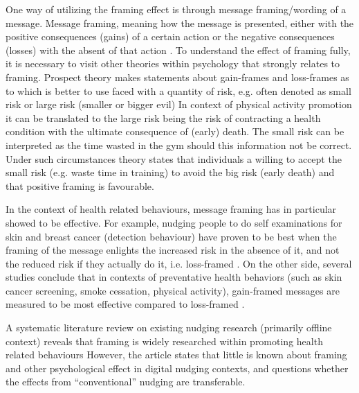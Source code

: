 One way of utilizing the framing effect is through message framing/wording of a message. Message framing, meaning how the message is presented, either with the positive consequences (gains) of a certain action or the negative consequences (losses) with the absent of that action \cite{rothman_shaping_1997}.
To understand the effect of framing fully, it is necessary to visit other theories within psychology that strongly relates to framing. Prospect theory makes statements about gain-frames and loss-frames as to which is better to use faced with a quantity of risk, e.g. often denoted as small risk or large risk (smaller or bigger evil)
In context of physical activity promotion it can be translated to the large risk being the risk of contracting a health condition with the ultimate consequence of (early) death. The small risk can be interpreted as the time wasted in the gym should this information not be correct. Under such circumstances theory states that individuals a willing to accept the small risk (e.g. waste time in training) to avoid the big risk (early death) and that positive framing is favourable. 

In the context of health related behaviours, message framing has in particular showed to be effective. For example, nudging people to do self examinations for skin and breast cancer (detection behaviour) have proven to be best when the framing of the message enlights the increased risk in the absence of it, and not the reduced risk if they actually do it, i.e. loss-framed \cite{thaler_nudge-_2009}.
On the other side, several studies conclude that in contexts of preventative health behaviors (such as skin cancer screening, smoke cessation, physical activity), gain-framed messages are measured to be most effective compared to loss-framed \cite{gallagher_health_2012}.

A systematic literature review on existing nudging research (primarily offline context) reveals that framing is widely researched within promoting health related behaviours
\cite{mirsch_digital_2017}
However, the article states that little is known about framing and other psychological effect in digital nudging contexts, and questions whether the effects from “conventional” nudging are transferable. 

